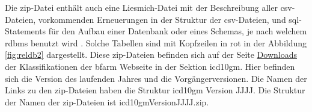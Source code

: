 Die \ac{zip}-Datei enthält auch eine Liesmich-Datei mit der Beschreibung aller \ac{csv}-Dateien, vorkommenden Erneuerungen in der Struktur der \ac{csv}-Dateien, und \ac{sql}-Statements für den Aufbau einer Datenbank oder eines Schemas, je nach welchem \ac{rdbms} benutzt wird \cite{readmel}. Solche Tabellen sind mit Kopfzeilen in rot in der Abbildung \ref{fig:reldb2} dargestellt. Diese \ac{zip}-Dateien befinden sich auf der Seite  \href{https://www.dimdi.de/dynamic/de/klassifikationen/downloads/}{Downloads} der Klassifikationen der \ac{bfarm} Webseite in der Sektion \ac{icd10gm}. Hier befinden sich die Version des laufenden Jahres und die Vorgängerversionen. Die Namen der Links zu den \ac{zip}-Dateien haben die Struktur \textsf{\ac{icd10gm} Version JJJJ}. Die Struktur der Namen der \ac{zip}-Dateien ist \textsf{\ac{icd10gm}VersionJJJJ.zip}.

